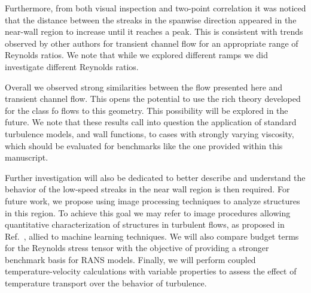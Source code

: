 \documentclass[twocolumn,10pt]{asme2e}
\begin{document}
Furthermore, from both visual inspection and two-point correlation it was noticed that the distance between the streaks in the spanwise direction appeared in the near-wall region to increase until it reaches a peak. This is consistent with trends observed by other authors for transient channel flow for an appropriate range of Reynolds ratios. We note that while we explored different ramps we did investigate different Reynolds ratios.

Overall we observed strong similarities between the flow presented here and transient channel flow. This opens the potential to use the rich theory developed for the class fo flows to this geometry. This possibility will be explored in the future. We note that these results call into question the application of standard turbulence models, and wall functions, to cases with strongly varying viscosity, which should be evaluated for benchmarks like the one provided within this manuscript.

Further investigation will also be dedicated to better describe and understand the behavior of the low-speed streaks in the near wall region is then required. For future work, we propose using image processing techniques to analyze structures in this region. To achieve this goal we may refer to image procedures allowing quantitative characterization of structures in turbulent flows, as proposed in Ref.~\cite{lin2008}, allied to machine learning techniques. We will also compare budget terms for the Reynolds stress tensor with the objective of providing a stronger benchmark basis for RANS models. Finally, we will  perform coupled temperature-velocity calculations with variable properties to assess the effect of temperature transport over the behavior of turbulence.




\appendix
\end{document}

